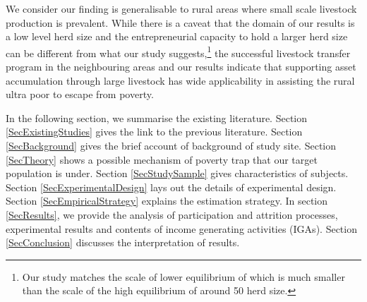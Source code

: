 	
	We consider our finding is generalisable to rural areas where small scale livestock production is prevalent. While there is a caveat that the domain of our results is a low level herd size and the entrepreneurial capacity to hold a larger herd size can be different from what our study suggests,\footnote{Our study matches the scale of lower equilibrium of \citet{Lybbertetal2004} which is much smaller than the scale of the high equilibrium of around 50 herd size. } the successful livestock transfer program in the neighbouring areas \citep{BandieraBRAC2017, Balboni2020} and our results indicate that supporting asset accumulation through large livestock has wide applicability in assisting the rural ultra poor to escape from poverty.


	In the following section, we summarise the existing literature. Section \ref{SecExistingStudies} gives the link to the previous literature. Section \ref{SecBackground} gives the brief account of background of study site. Section \ref{SecTheory} shows a possible mechanism of poverty trap that our target population is under. Section \ref{SecStudySample} gives characteristics of subjects. Section \ref{SecExperimentalDesign} lays out the details of experimental design. Section \ref{SecEmpiricalStrategy} explains the estimation strategy. In section \ref{SecResults}, we provide the analysis of participation and attrition processes, experimental results and contents of income generating activities (IGAs). Section \ref{SecConclusion} discusses the interpretation of results.


